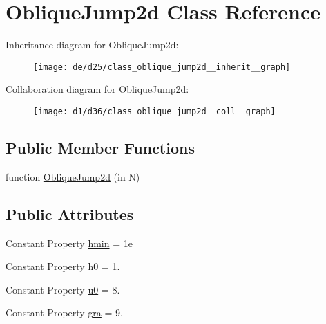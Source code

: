 \hypertarget{class_oblique_jump2d}{}\section{Oblique\+Jump2d Class Reference}
\label{class_oblique_jump2d}


Inheritance diagram for Oblique\+Jump2d\+:
\nopagebreak
\begin{figure}[H]
\begin{center}
\leavevmode
\texttt{[image: de/d25/class\_oblique\_jump2d\_\_inherit\_\_graph]}
\end{center}
\end{figure}


Collaboration diagram for Oblique\+Jump2d\+:
\nopagebreak
\begin{figure}[H]
\begin{center}
\leavevmode
\texttt{[image: d1/d36/class\_oblique\_jump2d\_\_coll\_\_graph]}
\end{center}
\end{figure}
\subsection*{Public Member Functions}
\begin{DoxyCompactItemize}
\item 
function \hyperlink{class_oblique_jump2d_af861efbdebdf7c5b00961b6addb750a9}{Oblique\+Jump2d} (in N)
\end{DoxyCompactItemize}
\subsection*{Public Attributes}
\begin{DoxyCompactItemize}
\item 
Constant Property \hyperlink{class_oblique_jump2d_ad4c6aa8e8c16f8a85ee6db316e25b784}{hmin} = 1e
\item 
Constant Property \hyperlink{class_oblique_jump2d_a94970c0f0914cac0c3b5e122ea8d51fd}{h0} = 1.
\item 
Constant Property \hyperlink{class_oblique_jump2d_a857cc00f3cc311dcc4b8ba93ab17ae99}{u0} = 8.
\item 
Constant Property \hyperlink{class_oblique_jump2d_ae07b5e15f8a905e0edfb5b14712eb235}{gra} = 9.
\end{DoxyCompactItemize}
